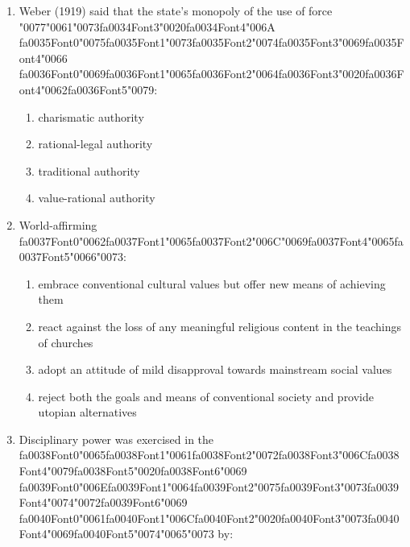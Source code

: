 \documentclass[12pt]{article}
\begin{document}
\begin{enumerate}[label=\arabic*.]
\item Weber (1919) said that the state's monopoly of the use of force {\char"0077}{\char"0061}{\char"0073}{\csname fa0034Font3\endcsname\char"0020}{\csname fa0034Font4\endcsname\char"006A} {\csname fa0035Font0\endcsname\char"0075}{\csname fa0035Font1\endcsname\char"0073}{\csname fa0035Font2\endcsname\char"0074}{\csname fa0035Font3\endcsname\char"0069}{\csname fa0035Font4\endcsname\char"0066} {\csname fa0036Font0\endcsname\char"0069}{\csname fa0036Font1\endcsname\char"0065}{\csname fa0036Font2\endcsname\char"0064}{\csname fa0036Font3\endcsname\char"0020}{\csname fa0036Font4\endcsname\char"0062}{\csname fa0036Font5\endcsname\char"0079}:
\begin{enumerate}[label=(\alph*)]
    \item charismatic authority
    \item rational-legal authority
    \item traditional authority
    \item value-rational authority
\end{enumerate}
\item World-affirming {\csname fa0037Font0\endcsname\char"0062}{\csname fa0037Font1\endcsname\char"0065}{\csname fa0037Font2\endcsname\char"006C}{\char"0069}{\csname fa0037Font4\endcsname\char"0065}{\csname fa0037Font5\endcsname\char"0066}{\char"0073}:
\begin{enumerate}[label=(\alph*)]
    \item embrace conventional cultural values but offer new means of achieving them
    \item react against the loss of any meaningful religious content in the teachings of churches
    \item adopt an attitude of mild disapproval towards mainstream social values
    \item reject both the goals and means of conventional society and provide utopian alternatives
\end{enumerate}
\item Disciplinary power was exercised in the {\csname fa0038Font0\endcsname\char"0065}{\csname fa0038Font1\endcsname\char"0061}{\csname fa0038Font2\endcsname\char"0072}{\csname fa0038Font3\endcsname\char"006C}{\csname fa0038Font4\endcsname\char"0079}{\csname fa0038Font5\endcsname\char"0020}{\csname fa0038Font6\endcsname\char"0069} {\csname fa0039Font0\endcsname\char"006E}{\csname fa0039Font1\endcsname\char"0064}{\csname fa0039Font2\endcsname\char"0075}{\csname fa0039Font3\endcsname\char"0073}{\csname fa0039Font4\endcsname\char"0074}{\char"0072}{\csname fa0039Font6\endcsname\char"0069} {\csname fa0040Font0\endcsname\char"0061}{\csname fa0040Font1\endcsname\char"006C}{\csname fa0040Font2\endcsname\char"0020}{\csname fa0040Font3\endcsname\char"0073}{\csname fa0040Font4\endcsname\char"0069}{\csname fa0040Font5\endcsname\char"0074}{\char"0065}{\char"0073} by:

\end{enumerate}
\end{document}
